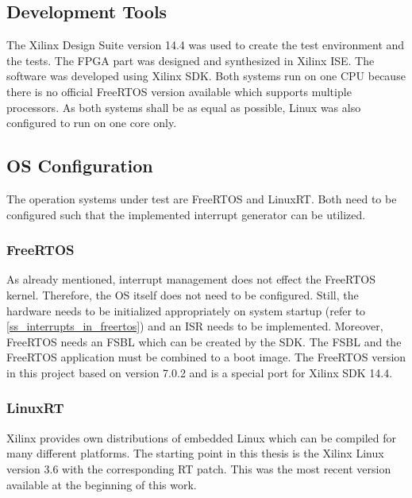 \subsection{Development Tools}
The Xilinx Design Suite version 14.4 was used to create the test environment and the tests.
The \ac{FPGA} part was designed and synthesized in Xilinx \ac{ISE}.
The software was developed using Xilinx \ac{SDK}.
Both systems run on one \ac{CPU} because there is no official FreeRTOS version available which supports multiple processors.
As both systems shall be as equal as possible, Linux was also configured to run on one core only.

\subsection{\ac{OS} Configuration}
The operation systems under test are FreeRTOS and LinuxRT.
Both need to be configured such that the implemented interrupt generator can be utilized.

\subsubsection{FreeRTOS}
As already mentioned, interrupt management does not effect the FreeRTOS kernel.
Therefore, the \ac{OS} itself does not need to be configured.
Still, the hardware needs to be initialized appropriately on system startup (refer to \ref{ss_interrupts_in_freertos}) and an \ac{ISR} needs to be implemented. 
Moreover, FreeRTOS needs an \ac{FSBL} which can be created by the \ac{SDK}.
The \ac{FSBL} and the FreeRTOS application must be combined to a boot image.
The FreeRTOS version in this project based on version 7.0.2 and is a special port for Xilinx \ac{SDK} 14.4.

\subsubsection{LinuxRT}\label{sss_linuxrt}
Xilinx provides own distributions of embedded Linux which can be compiled for many different platforms. 
The starting point in this thesis is the Xilinx Linux version 3.6 with the corresponding RT patch.
This was the most recent version available at the beginning of this work.

